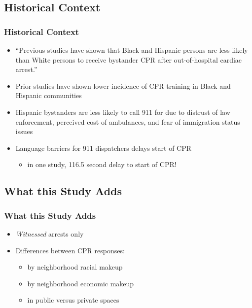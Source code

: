 \documentclass{beamer}
\begin{document}
	\subsection{Historical Context}
		\begin{frame}
			\frametitle{Historical Context}
			\begin{itemize}
				\item ``Previous studies have shown that Black and Hispanic persons are less likely than White persons to receive bystander CPR after out-of-hospital cardiac arrest.''\cite{sasson_association_2012}
				\item Prior studies have shown lower incidence of CPR training in Black and Hispanic communities \cite{anderson_rates_2014}
				\item Hispanic bystanders are less likely to call 911 for due to distrust of law enforcement, perceived cost of ambulances, and fear of immigration status issues \cite{sasson_barriers_2015}
				\item Language barriers for 911 dispatchers delays start of CPR
					\begin{itemize}
						\item in one study, 116.5 second delay to start of CPR!\cite{nuno_disparities_2017}
					\end{itemize}
			\end{itemize}
		\end{frame}
	\subsection{What this Study Adds}
		\begin{frame}
		\frametitle{What this Study Adds}
			\begin{itemize}
				\item \textit{Witnessed} arrests only
				\item Differences between CPR responses:
					\begin{itemize}
						\item by neighborhood racial makeup
						\item by neighborhood economic makeup
						\item in public versus private spaces
					\end{itemize}
			\end{itemize}
		\end{frame}
\end{document}
